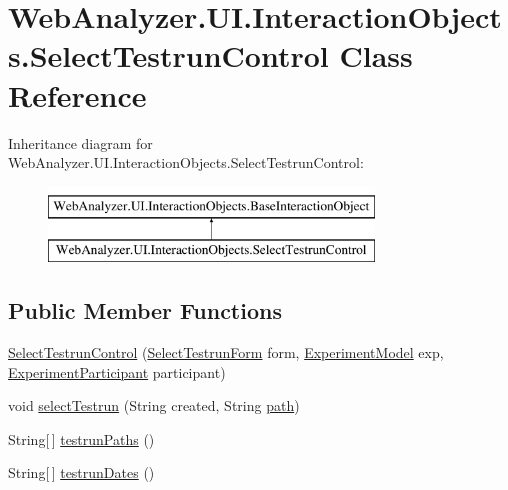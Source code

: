 \hypertarget{class_web_analyzer_1_1_u_i_1_1_interaction_objects_1_1_select_testrun_control}{}\section{Web\+Analyzer.\+U\+I.\+Interaction\+Objects.\+Select\+Testrun\+Control Class Reference}
\label{class_web_analyzer_1_1_u_i_1_1_interaction_objects_1_1_select_testrun_control}
Inheritance diagram for Web\+Analyzer.\+U\+I.\+Interaction\+Objects.\+Select\+Testrun\+Control\+:\begin{figure}[H]
\begin{center}
\leavevmode
\includegraphics[height=2.000000cm]{class_web_analyzer_1_1_u_i_1_1_interaction_objects_1_1_select_testrun_control}
\end{center}
\end{figure}
\subsection*{Public Member Functions}
\begin{DoxyCompactItemize}
\item 
\hyperlink{class_web_analyzer_1_1_u_i_1_1_interaction_objects_1_1_select_testrun_control_a4f0dbab279a50962ffdcc3b473e6167e}{Select\+Testrun\+Control} (\hyperlink{class_web_analyzer_1_1_u_i_1_1_select_testrun_form}{Select\+Testrun\+Form} form, \hyperlink{class_web_analyzer_1_1_models_1_1_base_1_1_experiment_model}{Experiment\+Model} exp, \hyperlink{class_web_analyzer_1_1_models_1_1_base_1_1_experiment_participant}{Experiment\+Participant} participant)
\item 
void \hyperlink{class_web_analyzer_1_1_u_i_1_1_interaction_objects_1_1_select_testrun_control_a72bf63ebb3acdce98d5403246ce1c24b}{select\+Testrun} (String created, String \hyperlink{bin_2x64_2_release_2_u_i_2_h_t_m_l_resources_2js_2src_2create__experiment_8js_aa72e0c8a20e6bcc571d3a1c51846e627}{path})
\item 
String\mbox{[}$\,$\mbox{]} \hyperlink{class_web_analyzer_1_1_u_i_1_1_interaction_objects_1_1_select_testrun_control_a57e1bd03061ac1ff242ceefd4833f604}{testrun\+Paths} ()
\item 
String\mbox{[}$\,$\mbox{]} \hyperlink{class_web_analyzer_1_1_u_i_1_1_interaction_objects_1_1_select_testrun_control_a56f1dc28ebb3c0894fd8407ccb27a40e}{testrun\+Dates} ()
\end{DoxyCompactItemize}
